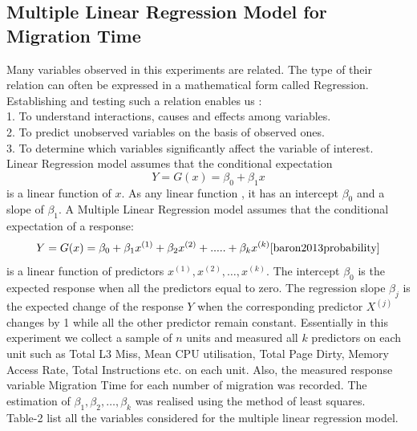 \documentclass[a4paper,10pt,twoside]{article}
\begin{document}
\subsection{Multiple Linear Regression Model for Migration Time}
Many variables observed in this experiments are related. The type of their relation can often be expressed in a mathematical form called Regression. Establishing and testing such a relation enables us :\\
1. To understand interactions, causes and effects among variables.\\
2. To predict unobserved variables on the basis of observed ones.\\
3. To determine which variables significantly affect the variable of interest.\\
Linear Regression model assumes that the conditional expectation \\
\begin{equation}
Y = G(x) = \beta_{0} + \beta_{1} x
\end{equation}
is a linear function of \(x\). As any linear function , it has an intercept \(  \beta_0 \) and a slope of \(  \beta_1 \).
A Multiple Linear Regression model assumes that the conditional expectation of a response: \cite{baron2013probability}
 \begin{equation}
Y = G(x) = \beta_{0} + \beta_{1} x^{(1)} + \beta_{2} x^{(2)} + ..... + \beta_{k} x^{(k)} 
\cite{baron2013probability}
\end{equation}
is a linear function of predictors \(  x^{(1)} , x^{(2)}  ,\ldots  ,x^{(k)}\). The intercept \( \beta_0 \) is the expected response when all the predictors equal to zero. The regression slope \( \beta_j \) is the expected change of the response \(Y\) when the corresponding predictor \(X^{(j)}\) changes by 1 while all the other predictor remain constant. 
Essentially in this experiment we collect a sample of \(n\) units and measured all \(k\) predictors on each unit such as Total L3 Miss, Mean CPU utilisation, Total Page Dirty,  Memory Access Rate, Total Instructions etc. on each unit. Also, the measured response variable Migration Time for each number of migration was recorded. The estimation of \(  \beta_1 , \beta_2, \ldots  ,\beta_k \) was realised using the method of least squares. \cite{baron2013probability} 
\\
Table-2 list all the variables considered for the multiple linear regression model.
\end{document}
